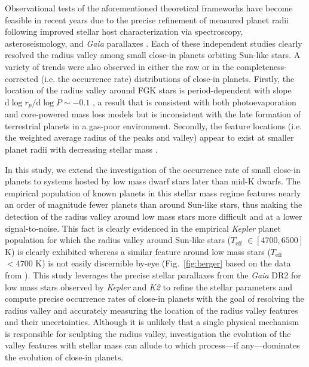 \documentclass[twocolumn]{emulateapj}
\newcommand{\gaia}[1]{\emph{Gaia}#1}
\newcommand{\kepler}[1]{\emph{Kepler}#1}
\newcommand{\ktwo}[1]{\emph{K2}#1}
\newcommand{\teff}[1]{$T_{\text{eff}}$#1}
\begin{document}
Observational tests of the aforementioned theoretical frameworks have become feasible in recent years due to 
the precise refinement of measured planet radii following improved stellar host characterization via  
spectroscopy, asteroseismology, and \gaia{} parallaxes
\citep[e.g.][]{fulton17,berger18,fulton18,vaneylen18,martinez19}. Each of these independent studies clearly
resolved the radius valley among small close-in planets orbiting Sun-like stars.
A variety of trends were also observed in either
the raw or in the completeness-corrected (i.e. the occurrence rate) distributions of close-in planets. Firstly,
the location of the radius valley around FGK stars is period-dependent with slope
$\mathrm{d}\log{r_p} / \mathrm{d}\log{P} \sim -0.1$ \citep{vaneylen18,martinez19}, a result that is consistent
with both photoevaporation and core-powered mass loss models but is inconsistent with the late formation of
terrestrial planets in a gas-poor environment. Secondly, the feature locations (i.e. the weighted
average radius of the peaks and valley) appear to exist at smaller planet radii with decreasing stellar
mass \citep{fulton18,wu19}.

In this study, we extend the investigation of the occurrence rate of small close-in planets to systems hosted by
low mass dwarf stars later than mid-K dwarfs.
The empirical population of known planets in this stellar mass regime features nearly an order of magnitude
fewer planets than around Sun-like stars, thus making the detection of the radius valley around low mass stars more
difficult and at a lower signal-to-noise. This fact is clearly evidenced in the empirical \kepler{} planet population
for which the radius valley around Sun-like stars (\teff{} $\in [4700,6500]$ K) is clearly exhibited whereas a similar
feature around low mass stars (\teff{} $< 4700$ K) is not easily discernible by-eye (Fig.~\ref{fig:berger} based on
the data from \citealt{berger18}). This study leverages the precise stellar parallaxes from the \gaia{} DR2
for low mass stars observed by \kepler{} and \ktwo{} to refine the stellar parameters and compute precise
occurrence rates of close-in planets with the goal of resolving the radius valley and accurately measuring the
location of the radius valley features and their uncertainties. Although it is unlikely that a single physical
mechanism is responsible for sculpting the radius valley, investigation the evolution of the valley features with
stellar mass can allude to which process---if any---dominates the evolution of close-in planets.
\end{document}
